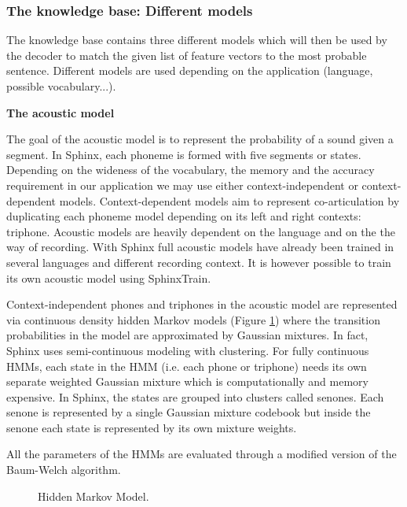 \subsubsection*{The knowledge base: Different models}
The knowledge base contains three different models which will then be used by the decoder to match the given list of feature vectors to the most probable sentence. Different models are used depending on the application (language, possible vocabulary...).  

\textbf{The acoustic model}

The goal of the acoustic model is to represent the probability of a sound given a segment. In Sphinx, each phoneme is formed with five segments or states. Depending on the wideness of the vocabulary, the memory and the accuracy requirement in our application we may use either context-independent or context-dependent models. Context-dependent models aim to represent co-articulation by duplicating each phoneme model depending on its left and right contexts: triphone. Acoustic models are heavily dependent on the language and on the the way of recording. With Sphinx full acoustic models have already been trained in several languages and different recording context. It is however possible to train its own acoustic model using SphinxTrain. 

Context-independent phones and triphones in the acoustic model are represented via continuous density hidden Markov models (Figure \ref{fig:HMM}) where the transition probabilities in the model are approximated by Gaussian mixtures. In fact, Sphinx uses semi-continuous modeling with clustering. For fully continuous HMMs, each state in the HMM (i.e. each phone or triphone) needs its own separate weighted Gaussian mixture which is computationally and memory expensive. In Sphinx, the states are grouped into clusters called senones. Each senone is represented by a single Gaussian mixture codebook but inside the senone each state is represented by its own mixture weights. 

All the parameters of the HMMs are evaluated through a modified version of the Baum-Welch algorithm. 


\begin{figure}[h!]
\caption{Hidden Markov Model.}
\label{fig:HMM}
\end{figure}


